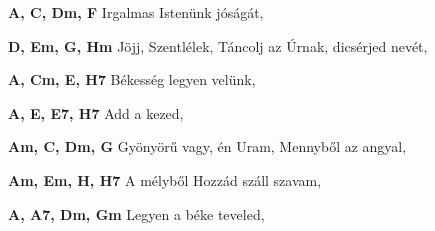 \begin{multicols}{2}
\begin{minipage}{\textwidth}
\end{minipage}
\begin{minipage}{\textwidth}
\textbf{A, C, Dm, F}\newline
\textbullet\hspace{1 mm}Irgalmas Istenünk jóságát, \pageref{IrgalmasIstenC3BCnkjC3B3sC3A1gC3A1t}\newline

\end{minipage}
\begin{minipage}{\textwidth}
\textbf{D, Em, G, Hm}\newline
\textbullet\hspace{1 mm}Jöjj, Szentlélek, \pageref{JC3B6jj2CSzentlC3A9lek}\newline
\textbullet\hspace{1 mm}Táncolj az Úrnak, dicsérjed nevét, \pageref{TC3A1ncoljazC39Arnak2CdicsC3A9rjednevC3A9t}\newline

\end{minipage}
\begin{minipage}{\textwidth}
\textbf{A, Cm, E, H7}\newline
\textbullet\hspace{1 mm}Békesség legyen velünk, \pageref{BC3A9kessC3A9glegyenvelC3BCnk}\newline

\end{minipage}
\begin{minipage}{\textwidth}
\textbf{A, E, E7, H7}\newline
\textbullet\hspace{1 mm}Add a kezed, \pageref{Addakezed}\newline

\end{minipage}
\begin{minipage}{\textwidth}
\textbf{Am, C, Dm, G}\newline
\textbullet\hspace{1 mm}Gyönyörű vagy, én Uram, \pageref{GyC3B6nyC3B6rC5B1vagy2CC3A9nUram}\newline
\textbullet\hspace{1 mm}Mennyből az angyal, \pageref{MennybC591lazangyal}\newline

\end{minipage}
\begin{minipage}{\textwidth}
\textbf{Am, Em, H, H7}\newline
\textbullet\hspace{1 mm}A mélyből Hozzád száll szavam, \pageref{AmC3A9lybC591lHozzC3A1dszC3A1llszavam}\newline

\end{minipage}
\begin{minipage}{\textwidth}
\textbf{A, A7, Dm, Gm}\newline
\textbullet\hspace{1 mm}Legyen a béke teveled, \pageref{LegyenabC3A9keteveled}\newline

\end{minipage}
\end{multicols}
